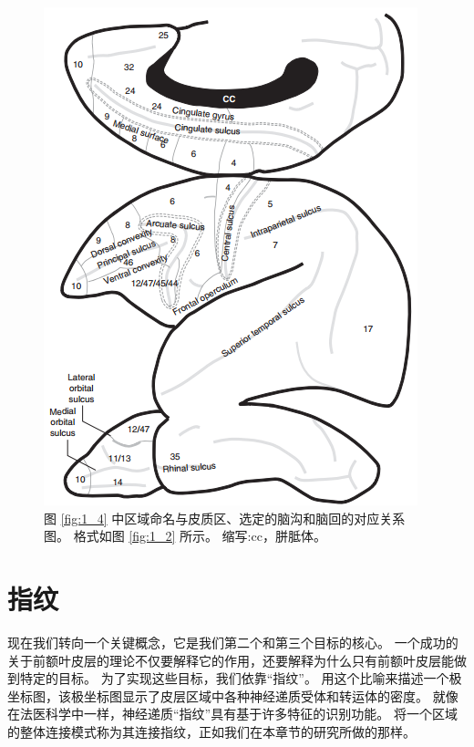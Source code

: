\begin{figure}[!htb]
	\centering
	\includegraphics[width=0.5\linewidth]{image_pfc/Fig_1_5}
	\caption{图 \ref{fig:1_4} 中区域命名与皮质区、选定的脑沟和脑回的对应关系图。
		格式如图 \ref{fig:1_2} 所示。
		缩写:cc，胼胝体。\label{fig:1_5}}
\end{figure}



\section{指纹}
现在我们转向一个关键概念，它是我们第二个和第三个目标的核心。
一个成功的关于前额叶皮层的理论不仅要解释它的作用，还要解释为什么只有前额叶皮层能做到特定的目标。
为了实现这些目标，我们依靠“指纹”。
用这个比喻来描述一个极坐标图\cite{zilles2001cyto}，该极坐标图显示了皮层区域中各种神经递质受体和转运体的密度。
就像在法医科学中一样，神经递质“指纹”具有基于许多特征的识别功能。
将一个区域的整体连接模式称为其连接指纹\cite{2002Dorsal}，正如我们在本章节的研究所做的那样。


